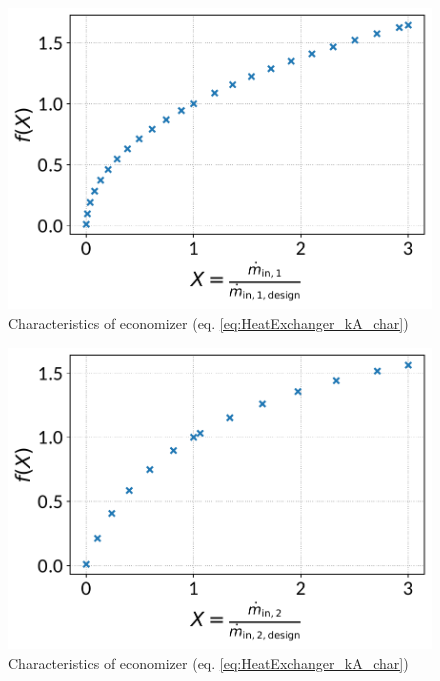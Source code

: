 \documentclass[]{article}
\begin{document}
\begin{minipage}{0.5\textwidth}
\begin{figure}[H]\begin{center}
\includegraphics[width=\textwidth]{figures/HeatExchanger_CharLine_kA_char1_economizer.pdf}
\caption{Characteristics of economizer (eq. \ref{eq:HeatExchanger_kA_char})}
\label{fig:CharLine_kA_char1_economizer}
\end{center}\end{figure}

\end{minipage}
\begin{minipage}{0.5\textwidth}
\begin{figure}[H]\begin{center}
\includegraphics[width=\textwidth]{figures/HeatExchanger_CharLine_kA_char2_economizer.pdf}
\caption{Characteristics of economizer (eq. \ref{eq:HeatExchanger_kA_char})}
\label{fig:CharLine_kA_char2_economizer}
\end{center}\end{figure}

\end{minipage}
\end{document}
